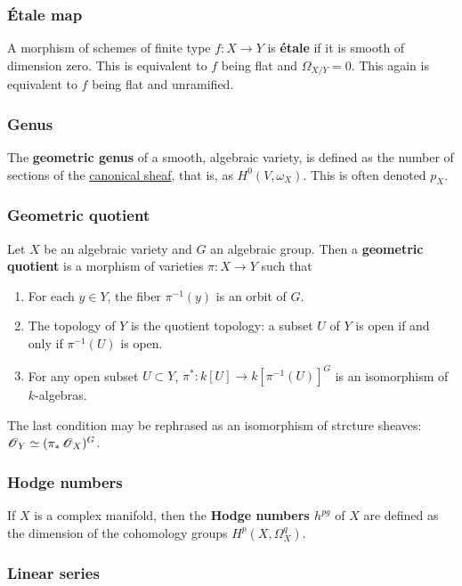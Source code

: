 \documentclass[11pt, english]{article}
\begin{document}
\subsubsection{Étale map}
\label{etalemap}

A morphism of schemes of finite type $f:X \to Y$ is \textbf{étale} if it is smooth of dimension zero. This is equivalent to $f$ being flat and $\Omega_{X/Y}=0$. This again is equivalent to $f$ being flat and unramified.

\subsubsection{Genus}
\label{genus}
 
The \textbf{geometric genus} of a smooth, algebraic variety, is defined as the number of sections of the \hyperref[canonicalsheaf]{canonical sheaf}, that is, as $H^0(V,\omega_X)$. This is often denoted $p_X$.

\subsubsection{Geometric quotient}
\label{geometricquotient}

Let $X$ be an algebraic variety and $G$ an algebraic group. Then a \textbf{geometric quotient} is a morphism of varieties $\pi:X \to Y$ such that
\begin{enumerate}
\item For each $y \in Y$, the fiber $\pi^{-1}(y)$ is an orbit of $G$.
\item The topology of $Y$ is the quotient topology: a subset $U$ of $Y$ is open if and only if $\pi^{-1}(U)$ is open.
\item For any open subset $U \subset Y$, $\pi^\ast: k[U] \to k[\pi^{-1}(U)]^G$ is an isomorphism of $k$-algebras.
\end{enumerate}
The last condition may be rephrased as an isomorphism of strcture sheaves: $\operatorname{\mathscr{O}}_Y \simeq (\pi_\ast \operatorname{\mathscr{O}}_X)^G$.   

\subsubsection{Hodge numbers}
\label{hodgenumbers}

If $X$ is a complex manifold, then the \textbf{Hodge numbers $h^{pg}$} of $X$ are defined as the dimension of the cohomology groups $H^p(X,\Omega_X^q)$.

\subsubsection{Linear series}
\label{linearseries}
\end{document}
